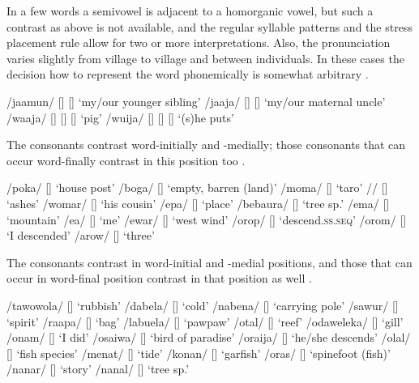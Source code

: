 In a few words a semivowel is adjacent to a homorganic vowel, but such a contrast as above is not available, and the regular syllable patterns and the stress placement rule allow for two or more interpretations. Also, the pronunciation varies slightly from village to village and between individuals.  In these cases the decision how to represent the word phonemically is somewhat arbitrary .

\ea
\label{ex:2:semiV-ambig}
\ea
/jaamun/  [] {\Tilde} []  `my/our younger sibling'
\ex
/jaaja/  [] {\Tilde} []  `my/our maternal uncle'
\ex
/waaja/  [] {\Tilde} [] {\Tilde} []  `pig'
\ex
/wuija/  [] {\Tilde} [] {\Tilde} []  `(s)he puts'
\z
\z

The  consonants contrast word-initially and -medially; those consonants that can occur word-finally contrast in this position too . 

\ea
\label{ex:2:bilabCons}
\ea
/poka/  []  `house post'
\ex
/boga/  []  `empty, barren (land)'
\ex
/moma/  []  `taro'
\ex
//  []  `ashes'
\ex
/womar/  []  `his cousin'
\ex
/epa/  []  `place'
\ex
/bebaura/  []  `tree sp.'
\ex
/ema/  []  `mountain'
\ex
/e{\textphi}a/  []  `me'
\ex
/ewar/  []  `west wind'
\ex
/orop/  []  `descend.\textsc{ss.seq}'
\ex
/orom/  []  `I descended'
\ex
/arow/  []  `three'
\z
\z


The  consonants contrast in word-initial and -medial positions, and those that can occur in word-final position contrast in that position as well .

\ea
\label{ex:2:alveolarCons}
\ea
/tawowola/  []  `rubbish'
\ex
/dabela/  []  `cold'
\ex
/nabena/  []  `carrying pole'
\ex
/sawur/  []  `spirit'    
\ex
/raapa/  []  `bag'
\ex
/labuela/  []  `pawpaw'
\ex
/otal/  []  `reef'
\ex
/odaweleka/  []  `gill'
\ex
/onam/  []  `I did'
\ex
/osaiwa/  []  `bird of paradise'
\ex
/oraija/  []  `he/she descends'
\ex
/olal/  []  `fish species'
\ex
/menat/  []  `tide'
\ex
/konan/  []  `garfish'
\ex
/oras/  []  `spinefoot (fish)'
\ex
/nanar/  []  `story'
\ex
/nanal/  []  `tree sp.'
\z
\z

